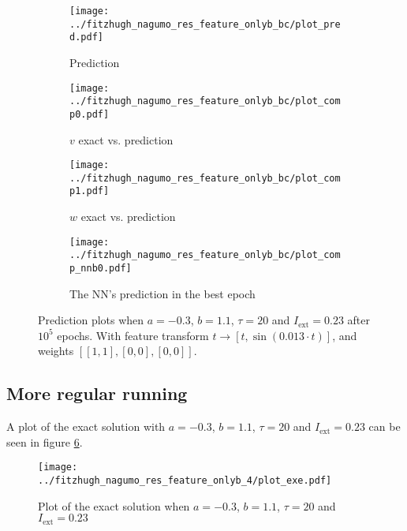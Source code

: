 \documentclass[a4paper]{article}
\begin{document}
\begin{figure}[H]
	\centering 
	\begin{subfigure}[b]{0.47\textwidth}
		\centering
		\texttt{[image: ../fitzhugh\_nagumo\_res\_feature\_onlyb\_bc/plot\_pred.pdf]}
		\caption{Prediction}
		\label{fig:justbauxa}
	\end{subfigure}
	\begin{subfigure}[b]{0.47\textwidth}
		\centering
		\texttt{[image: ../fitzhugh\_nagumo\_res\_feature\_onlyb\_bc/plot\_comp0.pdf]}
		\caption{$v$ exact vs. prediction}
		\label{fig:justbauxb}
	\end{subfigure}
	\begin{subfigure}[b]{0.47\textwidth}
		\centering
		\texttt{[image: ../fitzhugh\_nagumo\_res\_feature\_onlyb\_bc/plot\_comp1.pdf]}
		\caption{$w$ exact vs. prediction}
		\label{fig:justbauxc}
	\end{subfigure}
	\begin{subfigure}[b]{0.47\textwidth}
		\centering
		\texttt{[image: ../fitzhugh\_nagumo\_res\_feature\_onlyb\_bc/plot\_comp\_nnb0.pdf]}
		\caption{The NN's prediction in the best epoch}
		\label{fig:justbauxd}
	\end{subfigure}
	\caption{Prediction plots when $a=-0.3$, $b=1.1$, $\tau=20$ and $ I_{\text{ext}}=0.23$ after $10^5$ epochs. With feature transform $t \rightarrow \left[ t, \sin(0.013\cdot t) \right] $, and weights $\left[ \left[ 1, 1\right], \left[ 0, 0\right], \left[ 0, 0\right] \right]$.}
	\label{plot:justbaux}
\end{figure} 	



\subsection{More regular running}


A plot of the exact solution with $a=-0.3$, $b=1.1$, $\tau=20$ and $ I_{\text{ext}}=0.23$ can be seen in figure \ref{plot:exe0}.

\begin{figure}[H]
	\centering 
	\texttt{[image: ../fitzhugh\_nagumo\_res\_feature\_onlyb\_4/plot\_exe.pdf]}
	\caption{Plot of the exact solution when $a=-0.3$, $b=1.1$, $\tau=20$ and $ I_{\text{ext}}=0.23$}
	\label{plot:exe0}
\end{figure}
\end{document}
